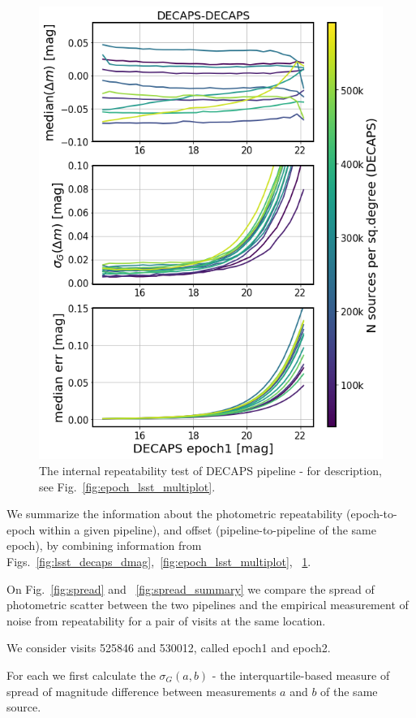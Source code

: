 \documentclass[DM,lsstdraft,toc,usenatbib]{lsstdoc}
\begin{document}
\begin{figure}
\begin{centering}
\includegraphics[width=0.8\columnwidth]{figs/decaps-decaps_rms_plot.png}
\caption{The internal repeatability test of DECAPS pipeline - for description, see Fig.~\ref{fig:epoch_lsst_multiplot}.}
\label{fig:epoch_decaps_multiplot}
\end{centering}
\end{figure} 

We summarize the information about the photometric repeatability (epoch-to-epoch within a given pipeline), and offset (pipeline-to-pipeline of the same epoch), by combining information from  Figs.~\ref{fig:lsst_decaps_dmag},~\ref{fig:epoch_lsst_multiplot}, ~\ref{fig:epoch_decaps_multiplot}. 

On Fig.~\ref{fig:spread} and ~\ref{fig:spread_summary} we compare the spread of photometric scatter between the 
two pipelines and  the empirical measurement of noise from repeatability for a pair of visits at the same location. 

We consider visits  525846 and 530012, called epoch1 and epoch2. 

For each we first calculate the $\sigma_{G}(a,b)$  - the interquartile-based measure of spread of magnitude difference between measurements $a$ and $b$ of the same source. 
\end{document}
